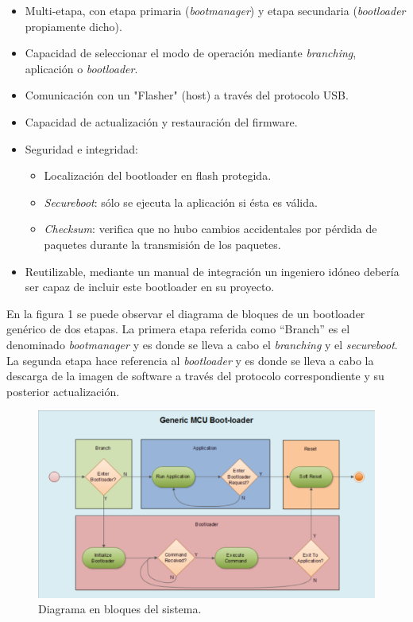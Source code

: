 \documentclass[
11pt, %
]{charter}
\begin{document}
\begin{itemize}
	\item Multi-etapa, con etapa primaria (\textit{bootmanager}) y etapa secundaria (\textit{bootloader} propiamente dicho).
	\item Capacidad de seleccionar el modo de operación mediante \textit{branching}, aplicación o \textit{bootloader}.
	\item Comunicación con un "Flasher" (host) a través del protocolo USB.
	\item Capacidad de actualización y restauración del firmware.
	\item Seguridad e integridad:
	\begin{itemize}
		\item Localización del bootloader en flash protegida.
		\item \textit{Secureboot}: sólo se ejecuta la aplicación si ésta es válida.
		\item \textit{Checksum}: verifica que no hubo cambios accidentales por pérdida de paquetes durante la transmisión de los paquetes.
	\end{itemize}
	\item Reutilizable, mediante un manual de integración un ingeniero idóneo debería ser capaz de incluir este bootloader en su proyecto.
\end{itemize}

En la figura 1 se puede observar el diagrama de bloques de un bootloader genérico de dos etapas. La primera etapa referida como ``Branch'' es el denominado \textit{bootmanager} y es donde se lleva a cabo el \textit{branching} y el \textit{secureboot}. La segunda etapa hace referencia al \textit{bootloader} y es donde se lleva a cabo la descarga de la imagen de software a través del protocolo correspondiente y su posterior actualización.


\begin{figure}[htpb]
\centering 
\includegraphics[width=.5\textwidth]{./Figuras/bootloader.png}
\caption{Diagrama en bloques del sistema.}
\label{fig:diagBloques}
\end{figure}
\end{document}
